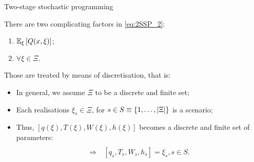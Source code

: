 \begin{frame}{Two-stage stochastic programming}
	
	There are two complicating factors in \eqref{eq:2SSP_2}:
		\vspace{-6pt}
	\begin{enumerate}
		\item $\mathbb{E}_\xi\left[ Q(x, \xi) \right]$; 
		\item $\forall \xi \in \Xi$.	
	\end{enumerate}
	
	\pause
	Those are treated by means of \alert{discretisation}, that is: 
	\vspace{-6pt} 
	\begin{itemize}
		\item In general, we assume $\Xi$ to be a \alert{discrete} and \alert{finite} set;
		\item Each realisations $\xi_s \in \Xi$, for $s \in S \equiv \left\{ 1, \dots, |\Xi| \right \}$ is a \alert{scenario};
		\item Thus,	$[q(\xi), T(\xi), W(\xi), h(\xi)]$ becomes a discrete and finite set of parameters:
		\begin{align*}
			 [&q(\xi_1), T(\xi_1), W(\xi_1), h(\xi_1); \\
			    &q(\xi_2), T(\xi_2), W(\xi_2), h(\xi_2); \\
			    &\dots ;\\
				& q(\xi_{|\Xi|}), T(\xi_{|\Xi|}), W(\xi_{|\Xi|}), h(\xi_{|\Xi|})] \\
				\Rightarrow~ & [q_s, T_s, W_s, h_s] = \xi_s, s \in S.
		\end{align*}
	\end{itemize}
	
\end{frame}


